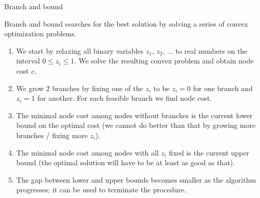 \documentclass{beamer}
\begin{document}
\begin{frame}{Branch and bound}
	\begin{flushleft}
		
		Branch and bound searches for the best solution by solving a series of convex optimization problems.
		
		{\small
		\begin{enumerate}
			\item We start by relaxing all binary variables $z_1$, $z_2$, ... to real numbers on the interval $0 \leq z_i \leq 1$. We solve the resulting convex problem and obtain node cost $c$.
			
			\item We grow 2 branches by fixing one of the $z_i$ to be $z_i = 0$ for one branch and $z_i = 1$ for another. For each feasible branch we find node cost.
			
			\item The minimal node cost among nodes without branches is the current lower bound on the optimal cost (we cannot do better than that by growing more branches / fixing more $z_i$).
			
			\item The minimal node cost among nodes with all $z_i$ fixed is the current upper bound (the optimal solution will have to be at least as good as that).
			
			\item The gap between lower and upper bounds becomes smaller as the algorithm progresses; it can be used to terminate the procedure.
		\end{enumerate}}
		
	\end{flushleft}
\end{frame}
\end{document}
